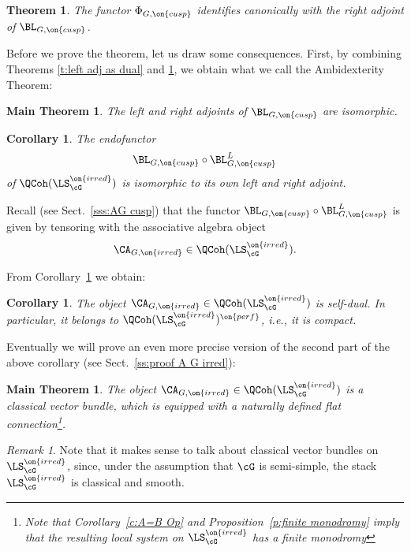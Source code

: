 \documentclass[9pt]{amsart}
\newtheorem{cor}[subsubsection]{Corollary}
\newtheorem{thm}[subsubsection]{Theorem}
\newtheorem{mainthm}[subsubsection]{Main Theorem}
\theoremstyle{remark}
\newtheorem{rem}[subsubsection]{Remark}
\theoremstyle{definition}
\theoremstyle{remark}
\newcommand{\secref}[1]{Sect.~\ref{#1}}
\newcommand{\propref}[1]{Proposition~\ref{#1}}
\newcommand{\corref}[1]{Corollary~\ref{#1}}
\numberwithin{equation}{section}
\begin{document}
\begin{thm} \label{t:right adj as dual}
The functor $\Phi_{G,\on{cusp}}$ identifies canonically with the right adjoint of $\BL_{G,\on{cusp}}$.
\end{thm}

\sssec{}

Before we prove the theorem, let us draw some consequences. First, by combining Theorems \ref{t:left adj as dual} and \ref{t:right adj as dual},
we obtain what we call the Ambidexterity Theorem: 

\begin{mainthm} \label{t:ambidex}
The left and right adjoints of $\BL_{G,\on{cusp}}$ are isomorphic.
\end{mainthm} 

\begin{cor}  \label{c:comp self-adj}
The endofunctor 
$$\BL_{G,\on{cusp}}\circ \BL^L_{G,\on{cusp}}$$
of $\QCoh(\LS^{\on{irred}}_\cG)$ is isomorphic to its own left and right adjoint.
\end{cor}

\sssec{}

Recall (see \secref{sss:AG cusp}) that the functor $\BL_{G,\on{cusp}}\circ \BL^L_{G,\on{cusp}}$
is given by tensoring with the associative algebra object
$$\CA_{G,\on{irred}}\in \QCoh(\LS^{\on{irred}}_\cG).$$

From \corref{c:comp self-adj} we obtain:

\begin{cor} \label{c:A G irred}
The object $\CA_{G,\on{irred}}\in \QCoh(\LS^{\on{irred}}_\cG)$ is self-dual. In particular, it 
belongs to $\QCoh(\LS^{\on{irred}}_\cG)^{\on{perf}}$, i.e., it is compact.
\end{cor}

Eventually we will prove an even more precise version of the second part of the above corollary (see \secref{ss:proof A G irred}): 

\begin{mainthm} \label{t:A G irred}
The object $\CA_{G,\on{irred}}\in \QCoh(\LS^{\on{irred}}_\cG)$ is a classical vector bundle, which is equipped
with a naturally defined flat connection\footnote{Note that \corref{c:A=B Op} and 
\propref{p:finite monodromy} imply that the resulting local system on $\LS^{\on{irred}}_\cG$ has a finite monodromy}. 
\end{mainthm}

\begin{rem}
Note that it makes sense to talk about classical vector bundles on $\LS^{\on{irred}}_\cG$, since,
under the assumption that $\cG$ is semi-simple, the stack $\LS^{\on{irred}}_\cG$ is classical and
smooth.
\end{rem}
\end{document}
